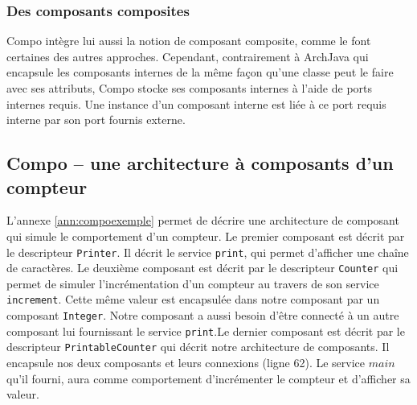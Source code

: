     \subsubsection{Des composants composites}
      
    Compo intègre lui aussi la notion de composant composite, comme le font certaines des autres approches. Cependant, contrairement à ArchJava qui encapsule les composants internes de la même façon qu'une classe peut le faire avec ses attributs, Compo stocke ses composants internes à l'aide de ports internes requis. Une instance d'un composant interne est liée à ce port requis interne par son port fournis externe.
  
    \subsection{Compo -- une architecture à composants d'un compteur}
    
    L'annexe \ref{ann:compoexemple} permet de décrire une architecture de composant qui simule le comportement d'un compteur. Le premier composant est décrit par le descripteur \texttt{Printer}. Il décrit le service \texttt{print}, qui permet d'afficher une chaîne de caractères. Le deuxième composant est décrit par le descripteur \texttt{Counter} qui permet de simuler l'incrémentation d'un compteur au travers de son service \texttt{increment}. Cette même valeur est encapsulée dans notre composant par un composant \texttt{Integer}. Notre composant a aussi besoin d'être connecté à un autre composant lui fournissant le service \texttt{print}.Le dernier composant est décrit par le descripteur \texttt{PrintableCounter} qui décrit notre architecture de composants. Il encapsule nos deux composants et leurs connexions (ligne 62). Le service $main$ qu'il fourni, aura comme comportement d'incrémenter le compteur et d'afficher sa valeur.  
    
      
      
      


      
      
